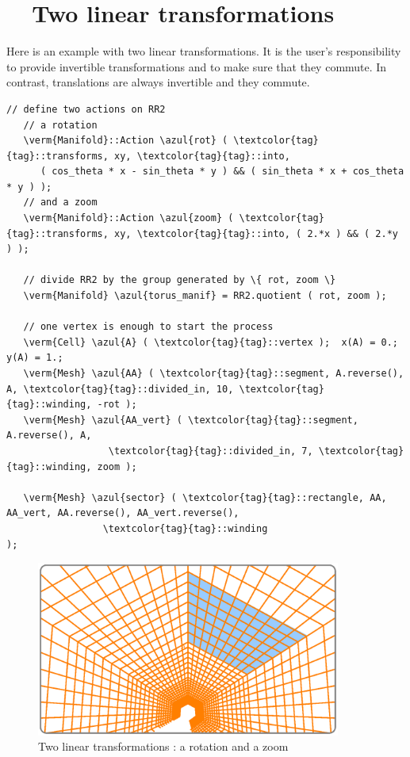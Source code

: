 \section{~~Two linear transformations}\label{\numb section 7.\numb parag 13}

Here is an example with two linear transformations.
It is the user's responsibility to provide invertible transformations and
to make sure that they commute.
In contrast, translations are always invertible and they commute.

\begin{Verbatim}[commandchars=\\\{\},formatcom=\small\tt,frame=single,
   label=parag-\ref{\numb section 7.\numb parag 13}.cpp,rulecolor=\color{coment},
   baselinestretch=0.94,framesep=2mm                                             ]
   // define two actions on RR2
   // a rotation
   \verm{Manifold}::Action \azul{rot} ( \textcolor{tag}{tag}::transforms, xy, \textcolor{tag}{tag}::into,
      ( cos_theta * x - sin_theta * y ) && ( sin_theta * x + cos_theta * y ) );
   // and a zoom
   \verm{Manifold}::Action \azul{zoom} ( \textcolor{tag}{tag}::transforms, xy, \textcolor{tag}{tag}::into, ( 2.*x ) && ( 2.*y ) );

   // divide RR2 by the group generated by \{ rot, zoom \}
   \verm{Manifold} \azul{torus_manif} = RR2.quotient ( rot, zoom );

   // one vertex is enough to start the process
   \verm{Cell} \azul{A} ( \textcolor{tag}{tag}::vertex );  x(A) = 0.;  y(A) = 1.;
   \verm{Mesh} \azul{AA} ( \textcolor{tag}{tag}::segment, A.reverse(), A, \textcolor{tag}{tag}::divided_in, 10, \textcolor{tag}{tag}::winding, -rot );
   \verm{Mesh} \azul{AA_vert} ( \textcolor{tag}{tag}::segment, A.reverse(), A,
                  \textcolor{tag}{tag}::divided_in, 7, \textcolor{tag}{tag}::winding, zoom );

   \verm{Mesh} \azul{sector} ( \textcolor{tag}{tag}::rectangle, AA, AA_vert, AA.reverse(), AA_vert.reverse(),
                 \textcolor{tag}{tag}::winding                                                    );
\end{Verbatim}
  
\begin{figure}[ht] \centering
  \includegraphics[width=100mm]{sector-3.eps}
  \caption{Two linear transformations : a rotation and a zoom}
  \label{\numb section 7.\numb fig 9}
\end{figure}


